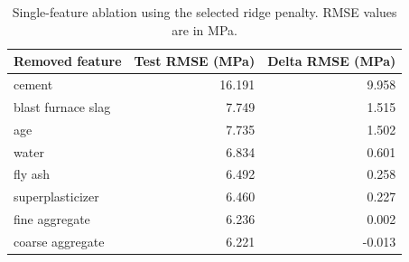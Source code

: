 \begin{table}
\caption{Single-feature ablation using the selected ridge penalty. RMSE values are in MPa.}
\label{tab:ablation}
\begin{tabular}{lrr}
\toprule
Removed feature & Test RMSE (MPa) & Delta RMSE (MPa) \\
\midrule
cement & 16.191 & 9.958 \\
blast furnace slag & 7.749 & 1.515 \\
age & 7.735 & 1.502 \\
water & 6.834 & 0.601 \\
fly ash & 6.492 & 0.258 \\
superplasticizer & 6.460 & 0.227 \\
fine aggregate & 6.236 & 0.002 \\
coarse aggregate & 6.221 & -0.013 \\
\bottomrule
\end{tabular}
\end{table}
